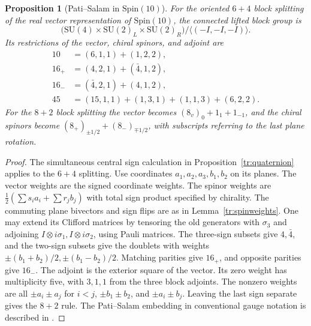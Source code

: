\documentclass[aps,pra,onecolumn,superscriptaddress,nofootinbib,10pt]{revtex4-2}
\newtheorem{proposition}[theorem]{Proposition}
\theoremstyle{definition}
\theoremstyle{remark}
\newcommand{\SU}{\mathrm{SU}}
\begin{document}
\begin{proposition}[Pati--Salam in \(\mathrm{Spin}(10)\)]\label{tr:spin10}
For the oriented \(6+4\) block splitting of the real vector
representation of \(\mathrm{Spin}(10)\), the connected lifted
block group is
\[
 \bigl(\SU(4)\times\SU(2)_L\times
              \SU(2)_R\bigr)/\langle(-I,-I,-I)\rangle.
\]
Its restrictions of the vector, chiral spinors, and adjoint are
\begin{align*}
 10&=(6,1,1)+(1,2,2),\\
 16_+&=(4,2,1)+(\bar4,1,2),\\
 16_-&=(\bar4,2,1)+(4,1,2),\\
 45&=(15,1,1)+(1,3,1)+(1,1,3)+(6,2,2).
\end{align*}
For the \(8+2\) block splitting the vector becomes
\((8_v)_0+1_1+1_{-1}\), and the chiral spinors become
\((8_+)_{\pm1/2}+(8_-)_{\mp1/2}\), with subscripts referring
to the last plane rotation.
\end{proposition}
\begin{proof}
The simultaneous central sign calculation in
Proposition~\ref{tr:quaternion} applies to the \(6+4\) splitting.
Use coordinates \(a_1,a_2,a_3,b_1,b_2\) on its planes.
The vector weights are the signed coordinate weights.
The spinor weights are
\(\frac12(\sum s_i a_i+\sum r_j b_j)\) with total sign
product specified by chirality. The commuting plane
bivectors and sign flips are as in Lemma~\ref{tr:spinweights}.
One may extend its Clifford matrices by tensoring the old
generators with \(\sigma_3\) and adjoining
\(I\otimes i\sigma_1,I\otimes i\sigma_2\), using Pauli matrices.
The three-sign subsets give \(4,\bar4\), and the two-sign
subsets give the doublets with weights
\(\pm(b_1+b_2)/2,\pm(b_1-b_2)/2\).
Matching parities give \(16_+\), and opposite parities give \(16_-\).
The adjoint is the exterior square of the vector. Its zero weight
has multiplicity five, with \(3,1,1\) from the three block
adjoints. The nonzero weights are all \(\pm a_i\pm a_j\) for
\(i<j\), \(\pm b_1\pm b_2\), and \(\pm a_i\pm b_j\).
Leaving the last sign separate gives the \(8+2\) rule.
The Pati--Salam embedding in conventional gauge notation
is described in \cite[\S3]{BaezHuerta}.
\end{proof}
\end{document}
